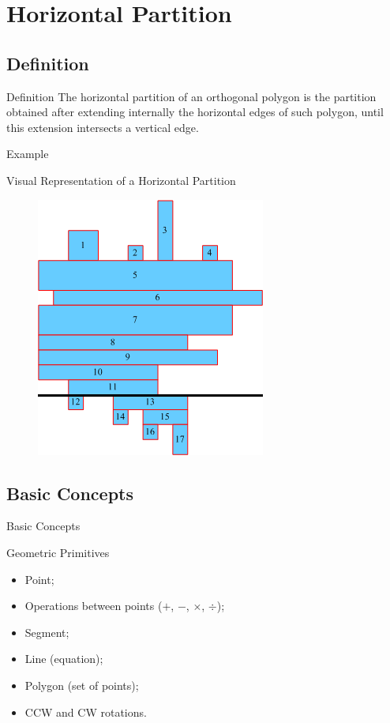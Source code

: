 \documentclass{beamer}
\begin{document}
\section{Horizontal Partition}
\subsection{Definition}
\begin{frame}
\begin{block}{Definition}
	The horizontal partition of an orthogonal polygon is the partition obtained after extending internally the horizontal edges of such polygon, until this extension intersects a vertical edge.
\end{block}
\end{frame}

\begin{frame}{Example}
\begin{block}{Visual Representation of a Horizontal Partition}
	\begin{figure}
		\includegraphics[scale=0.5]{images/horPartition}
	\end{figure}
\end{block}
\end{frame}

\subsection{Basic Concepts}
\begin{frame}{Basic Concepts}
\begin{block}{Geometric Primitives}
\begin{itemize}[<+->]
	\item Point;
	\item Operations between points ($+$, $-$, $\times$, $\div$);
	\item Segment;
	\item Line (equation);
	\item Polygon (set of points);
	\item CCW and CW rotations.
\end{itemize}
\end{block}
\end{frame}
\end{document}
